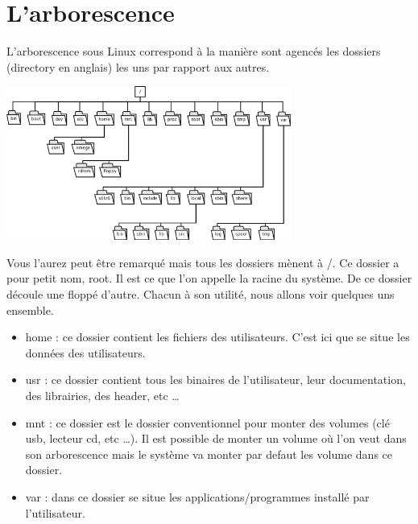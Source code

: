 \chapter{L'arborescence}

L'arborescence sous Linux correspond à la manière sont agencés les dossiers (directory en anglais) les uns par rapport aux autres.

\begin{center}
	\includegraphics[width=0.7\textwidth]{Images/arborescence.png}
\end{center}

Vous l'aurez peut être remarqué mais tous les dossiers mènent à /. Ce dossier a pour petit nom, root. Il est ce que l'on appelle la racine du système. De ce dossier découle une floppé d'autre. Chacun à son utilité, nous allons voir quelques uns ensemble.
\begin{itemize}
	\item home : ce dossier contient les fichiers des utilisateurs. C'est ici que se situe les données des utilisateurs.
	\item usr : ce dossier contient tous les binaires de l'utilisateur, leur documentation, des librairies, des header, etc …
	\item mnt : ce dossier est le dossier conventionnel pour monter des volumes (clé usb, lecteur cd, etc …). Il est possible de monter un volume où l'on veut dans son arborescence mais le système va monter par defaut les volume dans ce dossier.
	\item var : dans ce dossier se situe les applications/programmes installé par l'utilisateur.
\end{itemize}
